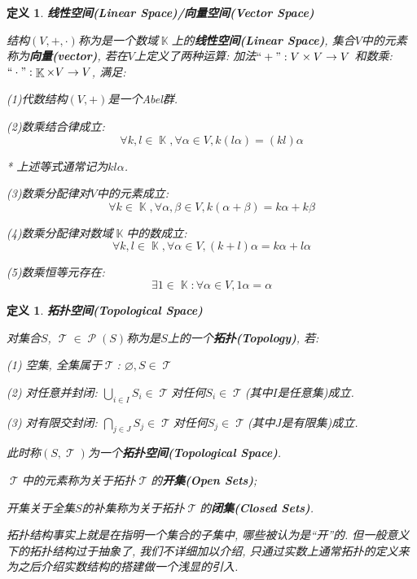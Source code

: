 \documentclass[UTF8]{ctexart}
\newcommand{\<}{\langle}
\renewcommand{\>}{\rangle}
\DeclareMathOperator{\K}{\mathbb{K}}
\DeclareMathOperator{\T}{\mathcal{T}}
\DeclareMathOperator{\PP}{\mathcal{P}}
\newtheorem{dfn}[thm]{定义}
\begin{document}
            \begin{dfn}
                \textbf{线性空间(Linear Space)/向量空间(Vector Space)}

                结构$(V,+,\cdot)$称为是一个数域$\K$上的\textbf{线性空间(Linear Space)}, 集合$V$中的元素称为\textbf{向量(vector)}, 若在$V$上定义了两种运算: 加法$``+": V\times V\to V$ 和数乘: $``\cdot": \K\times V \to V$, 满足:
    
                (1)代数结构$(V,+)$是一个Abel群. 
    
                (2)数乘结合律成立: 
                \[\forall k,l\in \K, \forall \alpha \in V, k(l\alpha) =(kl)\alpha\]
                
                * 上述等式通常记为$kl\alpha$. 
    
                (3)数乘分配律对$V$中的元素成立: 
                \[\forall k\in \K, \forall \alpha , \beta \in V, k(\alpha +\beta)=k\alpha+k\beta\]
    
                (4)数乘分配律对数域$\K$中的数成立: 
                \[\forall k,l\in \K, \forall \alpha \in V, (k+l)\alpha =k\alpha +l\alpha\]
                
                (5)数乘恒等元存在: 
                \[\exists 1\in \K: \forall \alpha \in V, 1\alpha=\alpha\]
            \end{dfn}
            
            \begin{dfn}
                \textbf{拓扑空间(Topological Space)}
                
                对集合$S$, $\T\in\PP(S)$称为是$S$上的一个\textbf{拓扑(Topology)}, 若: 

                (1) 空集, 全集属于$\T$: $\varnothing, S\in \T$

                (2) 对任意并封闭: $\bigcup\limits_{i\in I} S_i\in\T$对任何$S_i\in\T$(其中$I$是任意集)成立. 

                (3) 对有限交封闭: $\bigcap\limits_{j\in J} S_j\in\T$对任何$S_j\in\T$(其中$J$是有限集)成立. 

                此时称$(S,\T)$为一个\textbf{拓扑空间(Topological Space)}. 

                $\T$中的元素称为关于拓扑$\T$的\textbf{开集(Open Sets)}; 
                
                开集关于全集$S$的补集称为关于拓扑$\T$的\textbf{闭集(Closed Sets)}. 

                拓扑结构事实上就是在指明一个集合的子集中, 哪些被认为是``开''的. 但一般意义下的拓扑结构过于抽象了, 我们不详细加以介绍, 只通过实数上通常拓扑的定义来为之后介绍实数结构的搭建做一个浅显的引入. 
            \end{dfn}
\end{document}
